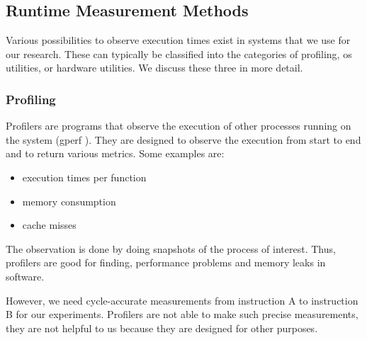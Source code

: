 \subsection{Runtime Measurement Methods}
\label{sec:approach:datageneration:runtime_methods}
Various possibilities to observe execution times exist in systems that we use for our research.
These can typically be classified into the categories of profiling, \ac{os} utilities, or hardware utilities.
We discuss these three in more detail.

\subsubsection{Profiling}
Profilers are programs that observe the execution of other processes running on the system (\eg gperf \cite{graham1982gprof}).
They are designed to observe the execution from start to end and to return various metrics. Some examples are:
\begin{itemize}
    \item execution times per function
    \item memory consumption
    \item cache misses
\end{itemize}
The observation is done by doing snapshots of the process of interest.
Thus, profilers are good for finding, \eg performance problems and memory leaks in software.

However, we need cycle-accurate measurements from instruction A to instruction B for our experiments.
Profilers are not able to make such precise measurements, \ie they are not helpful to us because they are designed for other purposes.

